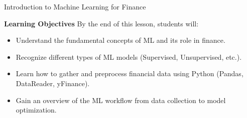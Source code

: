 \documentclass[11pt]{beamer}
\begin{document}
\begin{frame}{Introduction to Machine Learning for Finance}

\textbf{Learning Objectives}
\vspace{1cm}
By the end of this lesson, students will:
\begin{itemize}
\item Understand the fundamental concepts of ML and its role in finance.
\item Recognize different types of ML models (Supervised, Unsupervised, etc.).
\item Learn how to gather and preprocess financial data using Python (Pandas, DataReader, yFinance).
\item Gain an overview of the ML workflow from data collection to model optimization.
\end{itemize}
\end{frame}
\end{document}
